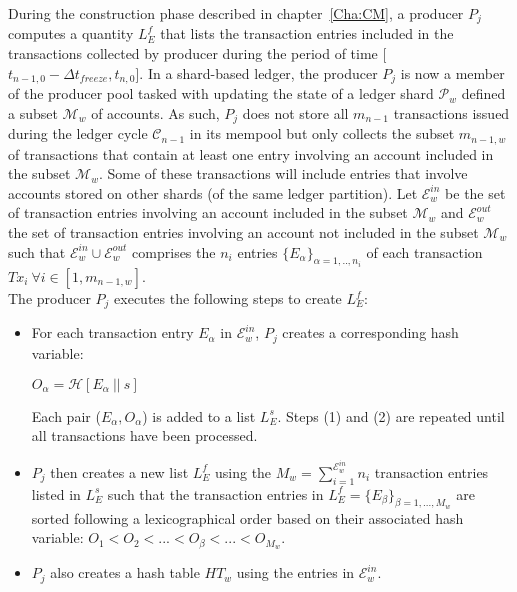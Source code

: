 During the construction phase described in chapter~\ref{Cha:CM}, a producer $P_j$ computes a quantity $L_E^f$ that lists the transaction entries included in the transactions collected by producer during the period of time [$t_{n-1,0} - \Delta t_{freeze}, t_{n,0}$]. In a shard-based ledger, the producer $P_j$ is now a member of the producer pool tasked with updating the state of a ledger shard $\mathcal{P}_w$ defined a subset $\mathcal{M}_w$ of accounts. As such, $P_j$ does not store all $m_{n-1}$ transactions issued during the ledger cycle $\mathcal{C}_{n-1}$ in its mempool but only collects the subset $m_{n-1,w}$ of transactions that contain at least one entry involving  an account included in the subset $\mathcal{M}_w$. Some of these transactions will include entries that involve accounts stored on other shards (of the same ledger partition). Let $\mathcal{E}^{in}_w$ be the set of transaction entries involving an account included in the subset $\mathcal{M}_w$ and $\mathcal{E}^{out}_w$ the set of transaction entries involving  an account not included in the subset $\mathcal{M}_w$ such that $\mathcal{E}^{in}_w \cup \mathcal{E}^{out}_w$ comprises the $n_i$ entries $\{E_\alpha\}_{\alpha=1,..,n_i}$ of each transaction $Tx_i~\forall i \in  [1, m_{n-1,w}]$.\\

The producer $P_j$ executes the following steps to create $L_E^f$:
\begin{itemize}
\item For each transaction entry $E_\alpha$ in $\mathcal{E}^{in}_w$, $P_j$ creates a corresponding hash variable: 
\begin{center}
$O_\alpha = \mathcal{H}[E_\alpha~||~s]$
\end{center}
Each pair ($E_\alpha,O_\alpha$) is added to a list $L^s_E$. Steps (1) and (2) are repeated until all transactions have been processed.
\item	$P_j$ then creates a new list $L^f_E$ using the $M_w=\sum_{i=1}^{\mathcal{E}^{in}_w}n_i$ transaction entries listed in $L^s_E$ such that the transaction entries in $L^f_E = \{E_\beta\}_{\beta=1,...,M_w}$ are sorted following a lexicographical order based on their associated hash variable: $O_1 < O_2 < ... < O_\beta < ... < O_{M_w}$. 
\item $P_j$ also creates a hash table $HT_w$ using the entries in $\mathcal{E}^{in}_w$.
\end{itemize}





